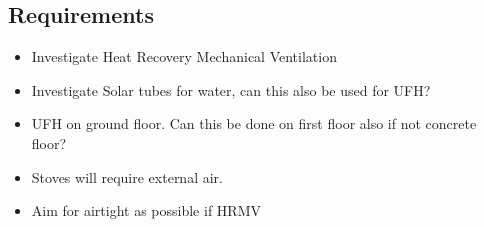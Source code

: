 \subsection{Requirements}
\begin{itemize}
\item Investigate Heat Recovery Mechanical Ventilation
\item Investigate Solar tubes for water, can this also be used for UFH?
\item UFH on ground floor. Can this be done on first floor also if not concrete floor?
\item Stoves will require external air.
\item Aim for airtight as possible if HRMV    
\end{itemize}

